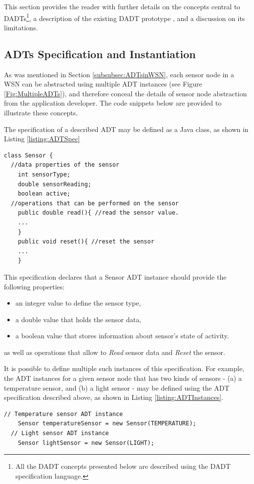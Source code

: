 This section provides the reader with
further details on the concepts central to DADTs\footnote{All the DADT concepts presented below
are described using the DADT specification language.}, a description of the
existing DADT prototype \cite{migliavacca_DADT:2006}, and a discussion on its limitations.

\subsection{ADTs Specification and Instantiation} \label{subsec:ADTSpecInst}

As was mentioned in Section \ref{subsubsec:ADTsinWSN}, each sensor node
in a WSN can be abstracted using multiple ADT instances (see
Figure \ref{Fig:MultipleADTs}), and therefore conceal the details of sensor
node abstraction from the application developer. The code snippets below are
provided to illustrate these concepts.

The specification of a described ADT may be defined as a Java
class, as shown in Listing \ref{listing:ADTSpec}

\begin{lstlisting}[frame=trbl, basewidth={0.55em, 0.6em}, captionpos=b,
basicstyle=\ttfamily\footnotesize, breaklines, caption = Sensor ADT instances, label =
listing:ADTSpec]
class Sensor {
  //data properties of the sensor 
    int sensorType;
    double sensorReading;
    boolean active; 
  //operations that can be performed on the sensor  
    public double read(){ //read the sensor value.
    ...
    } 
    public void reset(){ //reset the sensor
    ...
    }    
\end{lstlisting}
 
This specification declares that a Sensor ADT instance should provide the following properties:
\begin{itemize}
\item an integer value to define the sensor type,
\item a double value that holds the sensor data, 
\item a boolean value that stores information about sensor's state of activity.
\end{itemize}
as well as operations that allow to \emph{Read} sensor data and \emph{Reset}
the sensor.

It is possible to define multiple such instances of this specification. For
example, the ADT instances for a given sensor node that has two kinds of sensors
- (a) a temperature sensor, and (b) a light sensor - may be defined using the ADT
specification described above, as shown in Listing \ref{listing:ADTInstances}. 
\begin{lstlisting}[frame=trbl, basewidth={0.55em, 0.6em}, captionpos=b,
basicstyle=\ttfamily\footnotesize, breaklines, caption = Sensor ADT instances, label =
listing:ADTInstances]
  // Temperature sensor ADT instance
    Sensor temperatureSensor = new Sensor(TEMPERATURE);
  // Light sensor ADT instance  
    Sensor lightSensor = new Sensor(LIGHT);
\end{lstlisting}

